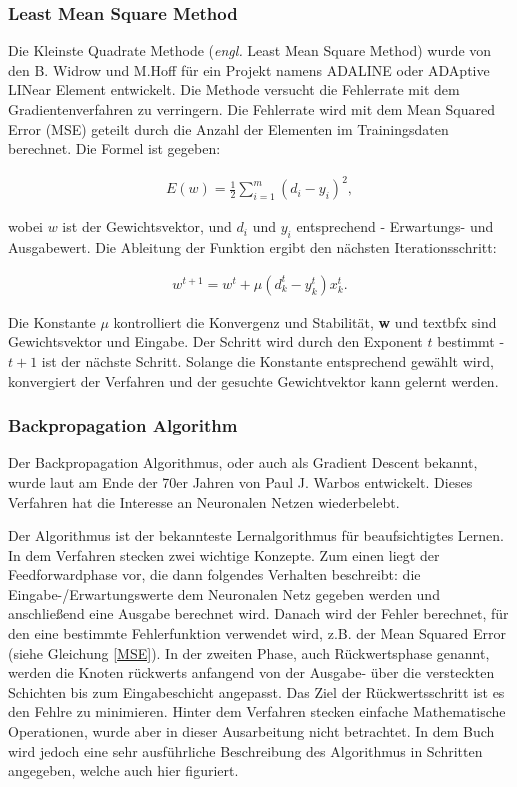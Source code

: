 \subsubsection{Least Mean Square Method}
Die Kleinste Quadrate Methode (\textit{engl.} Least Mean Square Method) wurde von den B. Widrow und M.Hoff für ein Projekt namens ADALINE oder ADAptive LINear Element entwickelt. Die Methode versucht die Fehlerrate mit dem Gradientenverfahren zu verringern. Die Fehlerrate wird mit dem Mean Squared Error (MSE) geteilt durch die Anzahl der Elementen im Trainingsdaten berechnet. Die Formel ist gegeben:

\begin{align}
	E(w) = \frac{1}{2} \sum_{i=1}^{m}(d_i - y_i)^2 \label{MSE}, 
\end{align}

wobei $w$ ist der Gewichtsvektor, und $d_i$ und $y_i$ entsprechend - Erwartungs- und Ausgabewert. Die Ableitung der Funktion ergibt den nächsten Iterationsschritt:

\begin{align}
	w^{t+1} = w^t + \mu(d_k^t - y_k^t)x_k^t.
\end{align}

Die Konstante $\mu$ kontrolliert die Konvergenz und Stabilität, \textbf{w} und textbf{x} sind Gewichtsvektor und Eingabe. Der Schritt wird durch den Exponent $t$ bestimmt - $t+1$ ist der nächste Schritt. Solange die Konstante entsprechend gewählt wird, konvergiert der Verfahren und der gesuchte Gewichtvektor kann gelernt werden. \cite{SCTemassi:01}

\subsubsection{Backpropagation Algorithm}
Der Backpropagation Algorithmus, oder auch als Gradient Descent bekannt, wurde laut \cite{SCTemassi:01} am Ende der 70er Jahren von Paul J. Warbos entwickelt. Dieses Verfahren hat die Interesse an Neuronalen Netzen wiederbelebt.

Der Algorithmus ist der bekannteste Lernalgorithmus für beaufsichtigtes Lernen. In dem Verfahren stecken zwei wichtige Konzepte. Zum einen liegt der Feedforwardphase vor, die dann folgendes Verhalten beschreibt: die Eingabe-/Erwartungswerte dem Neuronalen Netz gegeben werden und anschließend eine Ausgabe berechnet wird. Danach wird der Fehler berechnet, für den eine bestimmte Fehlerfunktion verwendet wird, z.B. der Mean Squared Error (siehe Gleichung \ref{MSE}). In der zweiten Phase, auch Rückwertsphase genannt, werden die Knoten rückwerts anfangend von der Ausgabe- über die versteckten Schichten bis zum Eingabeschicht angepasst. Das Ziel der Rückwertsschritt ist es den Fehlre zu minimieren. Hinter dem Verfahren stecken einfache Mathematische Operationen, wurde aber in dieser Ausarbeitung nicht betrachtet. In dem Buch \cite{SCTemassi:01} wird jedoch eine sehr ausführliche Beschreibung des Algorithmus in Schritten angegeben, welche auch hier figuriert.

